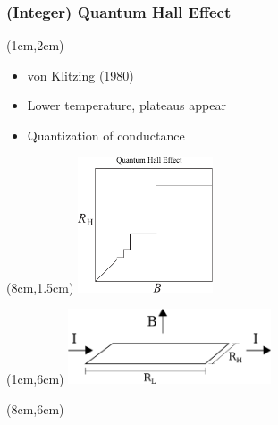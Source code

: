 \documentclass[xcolor=pdftex,dvipsnames]{beamer}
\begin{document}
\begin{frame}[t]
	  \frametitle{(Integer) Quantum Hall Effect}
    \begin{textblock*}{6cm}(1cm,2cm) %
    \begin{itemize}
    \item von Klitzing (1980)
    \item Lower temperature, plateaus appear
    \item Quantization of conductance 
    \end{itemize}
    \end{textblock*}

    \begin{textblock*}{4cm}(8cm,1.5cm) %
    \includegraphics[width=4cm]{QuantumHallEffectCartoon}
    \end{textblock*}

    \begin{textblock*}{6cm}(1cm,6cm) %
    \includegraphics[width=6cm]{FQHE_diagram}
    \end{textblock*}

    \begin{textblock*}{3cm}(8cm,6cm) %
    \end{textblock*}

\end{frame}
\end{document}
